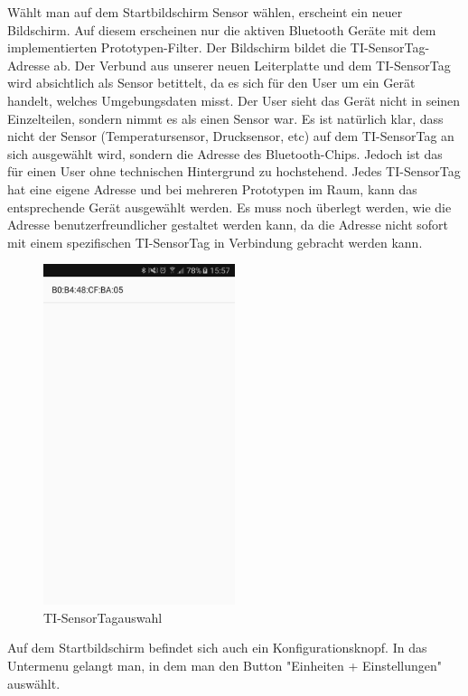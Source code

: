 Wählt man auf dem Startbildschirm \glqq Sensor wählen\grqq, erscheint ein neuer Bildschirm. Auf diesem erscheinen nur die aktiven Bluetooth Geräte mit dem implementierten Prototypen-Filter. Der Bildschirm bildet die TI-SensorTag-Adresse ab. Der Verbund aus unserer neuen Leiterplatte und dem TI-SensorTag wird absichtlich als Sensor betittelt, da es sich für den User um ein Gerät handelt, welches Umgebungsdaten misst. Der User sieht das Gerät nicht in seinen Einzelteilen, sondern nimmt es als einen Sensor war. Es ist natürlich klar, dass nicht der Sensor (Temperatursensor, Drucksensor, etc) auf dem TI-SensorTag an sich ausgewählt wird, sondern die Adresse des Bluetooth-Chips. Jedoch ist das für einen User ohne technischen Hintergrund zu hochstehend. Jedes TI-SensorTag hat eine eigene Adresse und bei mehreren Prototypen im Raum, kann das entsprechende Gerät ausgewählt werden. Es muss noch überlegt werden, wie die Adresse benutzerfreundlicher gestaltet werden kann, da die Adresse nicht sofort mit einem spezifischen TI-SensorTag in Verbindung gebracht werden kann.

\begin{figure}[ht]
    \includegraphics[width=0.5\textwidth]{4Resultate/imag/BLEAdresseAuswaehlen.png} 
    \caption{TI-SensorTagauswahl}
    \label{sensorauswahl}
\end{figure}

Auf dem Startbildschirm befindet sich auch ein Konfigurationsknopf. In das Untermenu gelangt man, in dem man den Button "Einheiten + Einstellungen" auswählt.

